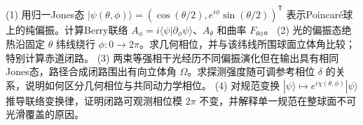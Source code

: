 (1) 用归一Jones态 \(|\psi(\theta,\phi)\rangle=(\cos(\theta/2),e^{i\phi}\sin(\theta/2))^{\mathsf T}\) 表示Poincaré球上的纯偏振。计算Berry联络 \(A_\phi=i\langle\psi|\partial_\phi\psi\rangle\)、\(A_\theta\) 和曲率 \(F_{\theta\phi}\)。
(2) 光的偏振态绝热沿固定 \(\theta\) 纬线绕行 \(\phi:0\to2\pi\)。求几何相位，并与该纬线所围球面立体角比较；特别计算赤道闭路。
(3) 两束等强相干光经历不同偏振演化但在输出具有相同Jones态，路径合成闭路围出有向立体角 \(\Omega\)。求探测强度随可调参考相位 \(\delta\) 的关系，说明如何区分几何相位与共同动力学相位。
(4) 对规范变换 \(|\psi\rangle\mapsto e^{i\chi(\theta,\phi)}|\psi\rangle\) 推导联络变换律，证明闭路可观测相位模 \(2\pi\) 不变，并解释单一规范在整球面不可光滑覆盖的原因。
